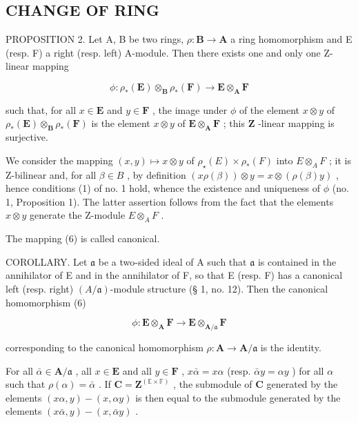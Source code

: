 \subsection{CHANGE OF RING}

PROPOSITION 2. Let A, B be two rings, \(\rho: \mathbf{B} \to \mathbf{A}\) a ring homomorphism and E (resp. F) a right (resp. left) A-module. Then there exists one and only one Z-linear mapping

\[
\phi : \rho_ {*} (\mathbf {E}) \otimes_ {\mathbf {B}} \rho_ {*} (\mathbf {F}) \rightarrow \mathbf {E} \otimes_ {\mathbf {A}} \mathbf {F}\tag{6}
\]

such that, for all \(x \in \mathbf{E}\) and \(y \in \mathbf{F}\) , the image under \(\phi\) of the element \(x \otimes y\) of \(\rho_{*}(\mathbf{E}) \otimes_{\mathbf{B}} \rho_{*}(\mathbf{F})\) is the element \(x \otimes y\) of \(\mathbf{E} \otimes_{\mathbf{A}} \mathbf{F}\) ; this \(\mathbf{Z}\) -linear mapping is surjective.

We consider the mapping \((x,y)\mapsto x\otimes y\) of \(\rho_{\star}(E)\times \rho_{*}(F)\) into \(E\otimes_A F\) ; it is Z-bilinear and, for all \(\beta \in B\) , by definition \((x\rho (\beta))\otimes y = x\otimes (\rho (\beta)y)\) , hence conditions (1) of no. 1 hold, whence the existence and uniqueness of \(\phi\) (no. 1, Proposition 1). The latter assertion follows from the fact that the elements \(x\otimes y\) generate the Z-module \(E\otimes_A F\) .

The mapping (6) is called canonical.

COROLLARY. Let \(\mathfrak{a}\) be a two-sided ideal of A such that \(\mathfrak{a}\) is contained in the annihilator of E and in the annihilator of F, so that E (resp. F) has a canonical left (resp. right) \((A/\mathfrak{a})\)-module structure (§ 1, no. 12). Then the canonical homomorphism (6)

\[
\phi : \mathbf {E} \otimes_ {\mathbf {A}} \mathbf {F} \rightarrow \mathbf {E} \otimes_ {\mathbf {A} / \mathfrak {a}} \mathbf {F}
\]

corresponding to the canonical homomorphism \(\rho: \mathbf{A} \to \mathbf{A} / \mathfrak{a}\) is the identity.

For all \(\bar{\alpha} \in \mathbf{A} / \mathfrak{a}\) , all \(x \in \mathbf{E}\) and all \(y \in \mathbf{F}\) , \(x\bar{\alpha} = x\alpha\) (resp. \(\bar{\alpha}y = \alpha y\) ) for all \(\alpha\) such that \(\rho(\alpha) = \bar{\alpha}\) . If \(\mathbf{C} = \mathbf{Z}^{(\mathbb{E} \times \mathbb{F})}\) , the submodule of \(\mathbf{C}\) generated by the elements \((x\alpha, y) - (x, \alpha y)\) is then equal to the submodule generated by the elements \((x\bar{\alpha}, y) - (x, \bar{\alpha}y)\) .

